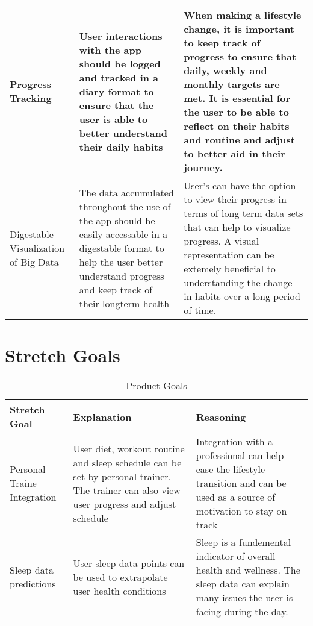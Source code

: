 \documentclass[12pt,letterpaper]{article}
\begin{document}
\begin{longtable}{ |p{3cm}|p{5cm}|p{5cm}| }
 \hline
 Progress Tracking & User interactions with the app should be logged and tracked in a diary format to ensure that the user is able to better understand their daily habits & When making a lifestyle change, it is important to keep track of progress to ensure that daily, weekly and monthly targets are met. It is essential for the user to be able to reflect on their habits and routine and adjust to better aid in their journey.   \\
 \hline
 Digestable Visualization of Big Data & The data accumulated throughout the use of the app should be easily accessable in a digestable format to help the user better understand progress and keep track of their longterm health  & User's can have the option to view their progress in terms of long term data sets that can help to visualize progress. A visual representation can be extemely beneficial to understanding the change in habits over a long period of time.    \\
 \hline
\end{longtable}

\section{Stretch Goals}

\begin{longtable}{ |p{3cm}|p{5cm}|p{5cm}| }
 \caption{Product Goals} \\ 
\toprule 
\textbf{Stretch Goal} &\textbf{ Explanation} & \textbf{Reasoning}\\
 \midrule
 Personal Traine Integration & User diet, workout routine and sleep schedule can be set by personal trainer. The trainer can also view user progress and adjust schedule & Integration with a professional can help ease the lifestyle transition and can be used as a source of motivation to stay on track  \\
 \hline
 Sleep data predictions & User sleep data points can be used to extrapolate user health conditions & Sleep is a fundemental indicator of overall health and wellness. The sleep data can explain many issues the user is facing during the day. \\
 \hline

\end{longtable}
\end{document}
